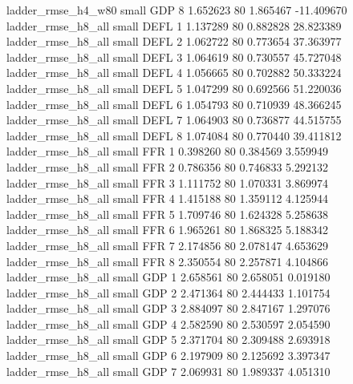       ladder_rmse_h4_w80      small      GDP                 8 1.652623 80       1.865467         -11.409670
      ladder_rmse_h8_all      small     DEFL                 1 1.137289 80       0.882828          28.823389
      ladder_rmse_h8_all      small     DEFL                 2 1.062722 80       0.773654          37.363977
      ladder_rmse_h8_all      small     DEFL                 3 1.064619 80       0.730557          45.727048
      ladder_rmse_h8_all      small     DEFL                 4 1.056665 80       0.702882          50.333224
      ladder_rmse_h8_all      small     DEFL                 5 1.047299 80       0.692566          51.220036
      ladder_rmse_h8_all      small     DEFL                 6 1.054793 80       0.710939          48.366245
      ladder_rmse_h8_all      small     DEFL                 7 1.064903 80       0.736877          44.515755
      ladder_rmse_h8_all      small     DEFL                 8 1.074084 80       0.770440          39.411812
      ladder_rmse_h8_all      small      FFR                 1 0.398260 80       0.384569           3.559949
      ladder_rmse_h8_all      small      FFR                 2 0.786356 80       0.746833           5.292132
      ladder_rmse_h8_all      small      FFR                 3 1.111752 80       1.070331           3.869974
      ladder_rmse_h8_all      small      FFR                 4 1.415188 80       1.359112           4.125944
      ladder_rmse_h8_all      small      FFR                 5 1.709746 80       1.624328           5.258638
      ladder_rmse_h8_all      small      FFR                 6 1.965261 80       1.868325           5.188342
      ladder_rmse_h8_all      small      FFR                 7 2.174856 80       2.078147           4.653629
      ladder_rmse_h8_all      small      FFR                 8 2.350554 80       2.257871           4.104866
      ladder_rmse_h8_all      small      GDP                 1 2.658561 80       2.658051           0.019180
      ladder_rmse_h8_all      small      GDP                 2 2.471364 80       2.444433           1.101754
      ladder_rmse_h8_all      small      GDP                 3 2.884097 80       2.847167           1.297076
      ladder_rmse_h8_all      small      GDP                 4 2.582590 80       2.530597           2.054590
      ladder_rmse_h8_all      small      GDP                 5 2.371704 80       2.309488           2.693918
      ladder_rmse_h8_all      small      GDP                 6 2.197909 80       2.125692           3.397347
      ladder_rmse_h8_all      small      GDP                 7 2.069931 80       1.989337           4.051310
